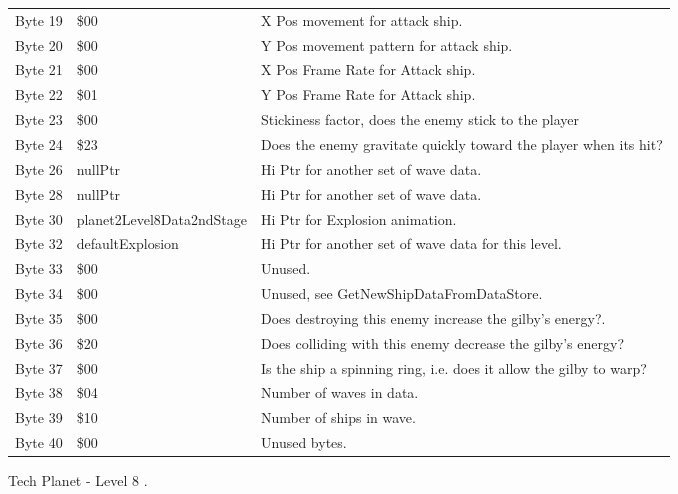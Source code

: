 \begin{figure}[H]
{\begin{adjustbox}{width=12cm}
\begin{tabular}{lll}
 Byte 19 & \$00                       & X Pos movement for attack ship.                                    \\
 Byte 20 & \$00                       & Y Pos movement pattern for attack ship.                            \\
 Byte 21 & \$00                       & X Pos Frame Rate for Attack ship.                                  \\
 Byte 22 & \$01                       & Y Pos Frame Rate for Attack ship.                                  \\
 Byte 23 & \$00                       & Stickiness factor, does the enemy stick to the player              \\
 Byte 24 & \$23                       & Does the enemy gravitate quickly toward the player when its hit?   \\
 Byte 26 & nullPtr                   & Hi Ptr for another set of wave data.                               \\
 Byte 28 & nullPtr                   & Hi Ptr for another set of wave data.                               \\
 Byte 30 & planet2Level8Data2ndStage & Hi Ptr for Explosion animation.                                    \\
 Byte 32 & defaultExplosion          & Hi Ptr for another set of wave data for this level.                \\
 Byte 33 & \$00                       & Unused.                                                            \\
 Byte 34 & \$00                       & Unused, see GetNewShipDataFromDataStore.                           \\
 Byte 35 & \$00                       & Does destroying this enemy increase the gilby's energy?.           \\
 Byte 36 & \$20                       & Does colliding with this enemy decrease the gilby's energy?        \\
 Byte 37 & \$00                       & Is the ship a spinning ring, i.e. does it allow the gilby to warp? \\
 Byte 38 & \$04                       & Number of waves in data.                                           \\
 Byte 39 & \$10                       & Number of ships in wave.                                           \\
 Byte 40 & \$00                       & Unused bytes.                                                      \\
\bottomrule
\end{tabular}

  \end{adjustbox}

  }\caption*{Tech Planet - Level 8
.}
\end{figure}

